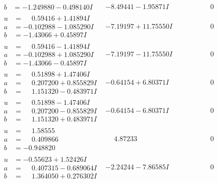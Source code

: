 \documentclass[1p]{elsarticle_modified}
\theoremstyle{definition}
\begin{document}
$$\begin{array}{c|c|c}
\begin{aligned}
b &= -1.249880 - 0.498140 I\end{aligned}
 & -8.49441 - 1.95871 I & \phantom{-0.000000 } 0 \\ \hline\begin{aligned}
u &= \phantom{-}0.59416 + 1.41894 I \\
a &= -0.102988 - 1.085290 I \\
b &= -1.43066 + 0.45897 I\end{aligned}
 & -7.19197 + 11.75550 I & \phantom{-0.000000 } 0 \\ \hline\begin{aligned}
u &= \phantom{-}0.59416 - 1.41894 I \\
a &= -0.102988 + 1.085290 I \\
b &= -1.43066 - 0.45897 I\end{aligned}
 & -7.19197 - 11.75550 I & \phantom{-0.000000 } 0 \\ \hline\begin{aligned}
u &= \phantom{-}0.51898 + 1.47406 I \\
a &= \phantom{-}0.207200 + 0.855829 I \\
b &= \phantom{-}1.151320 - 0.483971 I\end{aligned}
 & -0.64154 + 6.80371 I & \phantom{-0.000000 } 0 \\ \hline\begin{aligned}
u &= \phantom{-}0.51898 - 1.47406 I \\
a &= \phantom{-}0.207200 - 0.855829 I \\
b &= \phantom{-}1.151320 + 0.483971 I\end{aligned}
 & -0.64154 - 6.80371 I & \phantom{-0.000000 } 0 \\ \hline\begin{aligned}
u &= \phantom{-}1.58555\phantom{ +0.000000I} \\
a &= \phantom{-}0.409866\phantom{ +0.000000I} \\
b &= -0.948820\phantom{ +0.000000I}\end{aligned}
 & \phantom{-}4.87233\phantom{ +0.000000I} & \phantom{-0.000000 } 0 \\ \hline\begin{aligned}
u &= -0.55623 + 1.52426 I \\
a &= \phantom{-}0.407315 - 0.689064 I \\
b &= \phantom{-}1.364050 + 0.276302 I\end{aligned}
 & -2.24244 - 7.86585 I & \phantom{-0.000000 } 0 \\ \hline\begin{aligned}

\end{aligned}
\end{array}$$
\end{document}
